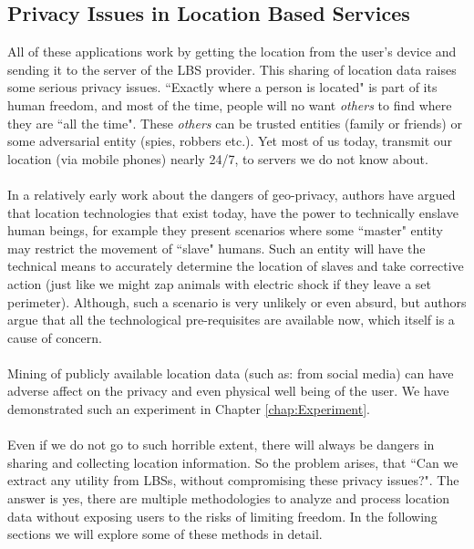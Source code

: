 \documentclass[12pt]{report}
\theoremstyle{named}
\begin{document}
\subsection{Privacy Issues in Location Based Services}
All of these applications work by getting the location from the user's device and sending it to the server of the LBS provider. This sharing of location data raises some serious privacy issues. ``Exactly where a person is located" is part of its human freedom, and most of the time, people will no want \textit{others} to find where they are ``all the time". These \textit{others} can be trusted entities (family or friends) or some adversarial entity (spies, robbers etc.). Yet most of us today, transmit our location (via mobile phones) nearly 24/7, to servers we do not know about.

\paragraph{}
In a relatively early work \cite{dobson2003geoslavery} about the dangers of geo-privacy, authors have argued that location technologies that exist today, have the power to technically enslave human beings, for example they present scenarios where some ``master" entity may restrict the movement of ``slave" humans. Such an entity will have the technical means to accurately determine the location of slaves and take corrective action (just like we might zap animals with electric shock if they leave a set perimeter). Although, such a scenario is very unlikely or even absurd, but authors argue that all the technological pre-requisites are available now, which itself is a cause of concern.

\paragraph{}
Mining of publicly available location data (such as: from social media) can have adverse affect on the privacy and even physical well being of the user. We have demonstrated such an experiment in Chapter \ref{chap:Experiment}. 



\paragraph{}
Even if we do not go to such horrible extent, there will always be dangers in sharing and collecting location information. So the problem arises, that ``Can we extract any utility from LBSs, without compromising these privacy issues?". The answer is yes, there are multiple methodologies to analyze and process location data without exposing users to the risks of limiting freedom.  In the following sections we will explore some of these methods in detail.
\end{document}
